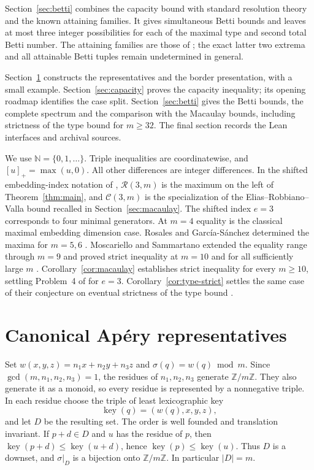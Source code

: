 \documentclass[11pt]{article}
\theoremstyle{definition}
\theoremstyle{remark}
\theoremstyle{plain}
\begin{document}
Section~\ref{sec:betti} combines the capacity bound with standard
resolution theory and the known attaining families. It gives simultaneous
Betti bounds and leaves at most three integer possibilities for each of
the maximal type and second total Betti number. The attaining families
are those of \cite{EHOOPK24}; the exact latter two extrema and all
attainable Betti tuples remain undetermined in general.

Section~\ref{sec:canonical} constructs the representatives and the
border presentation, with a small example. Section~\ref{sec:capacity}
proves the capacity inequality; its opening roadmap identifies the
case split. Section~\ref{sec:betti} gives the Betti bounds, the complete
spectrum and the comparison with the Macaulay bounds, including strictness
of the type bound for $m\ge32$. The final section records the Lean
interfaces and archival sources.

We use $\mathbb N=\{0,1,\ldots\}$. Triple inequalities are coordinatewise,
and $[u]_+=\max(u,0)$. All other differences are integer differences.
In the shifted embedding-index notation of \cite{MS25},
$\mathcal R(3,m)$ is the maximum on the left of Theorem~\ref{thm:main},
and $\mathcal C(3,m)$ is the specialization of the
Elias--Robbiano--Valla bound recalled in Section~\ref{sec:macaulay}.
The shifted index $e=3$ corresponds to four minimal generators.
At $m=4$ equality is the classical maximal embedding dimension case.
Rosales and Garc\'ia-S\'anchez determined the maxima for $m=5,6$
\cite[Theorems~1 and~2]{RGS98}. Moscariello and Sammartano extended the
equality range through $m=9$ and proved strict inequality at $m=10$ and
for all sufficiently large $m$
\cite[Theorem~3.3, Example~4.3 and Theorem~4.4]{MS25}.
Corollary~\ref{cor:macaulay} establishes strict inequality for every
$m\ge10$, settling Problem~4 of \cite{MSSurvey25} for $e=3$.
Corollary~\ref{cor:type-strict} settles the same case of their conjecture
on eventual strictness of the type bound \cite[Conjecture~5.3]{MS25}.

\section{Canonical Ap\'ery representatives}
\label{sec:canonical}
Set $w(x,y,z)=n_1x+n_2y+n_3z$ and
$\sigma(q)=w(q)\bmod m$. Since $\gcd(m,n_1,n_2,n_3)=1$, the residues
of $n_1,n_2,n_3$ generate $\mathbb Z/m\mathbb Z$. They also generate it
as a monoid, so every residue is represented by a nonnegative triple.
In each residue choose the triple of least lexicographic key
\[
\operatorname{key}(q)=(w(q),x,y,z),
\]
and let $D$ be the resulting set. The order is well founded and
translation invariant. If $p+d\in D$ and $u$ has the residue of $p$,
then $\operatorname{key}(p+d)\le \operatorname{key}(u+d)$, hence $\operatorname{key}(p)\le \operatorname{key}(u)$. Thus $D$ is a
downset, and $\sigma|_D$ is a bijection onto $\mathbb Z/m\mathbb Z$.
In particular $|D|=m$.
\end{document}
